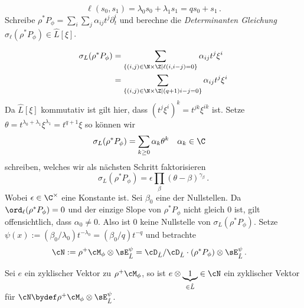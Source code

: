 \[
\ell(s_0,s_1)=\lambda_0s_0+\lambda_1s_1=qs_0+s_1 \,.
\]
Schreibe $\rho^*P_{\phi}=\sum_i\sum_j\alpha_{ij}t^j\partial_t^i$ und berechne
die \emph{Determinanten Gleichung} $\sigma_\ell(\rho^*P_{\phi})\in \hat L[\xi]$.
\begin{comment}
Schon gezeigt, das $ord_\ell = 0$?
\end{comment}
\begin{align*}
\sigma_L(\rho^*P_{\phi})
  &= \sum_{\{(i,j)\in\N\times\Z \mid \ell(i,i-j)=0\}}\alpha_{ij}t^j\xi^i\\
  &= \sum_{\{(i,j)\in\N\times\Z \mid (q+1)i-j=0\}}\alpha_{ij}t^j\xi^i
\end{align*}
Da $\hat L[\xi]$ kommutativ ist gilt hier, dass $(t^j\xi^i)^k=t^{jk}\xi^{ik}$ ist.
Setze $\theta=t^{\lambda_0+\lambda_1}\xi^{\lambda_1}=t^{q+1}\xi$ so können wir
\begin{align*}
\sigma_L(\rho^*P_{\phi}) &= \sum_{k\geq 0}\alpha_k\theta^k & & \alpha_k\in\C
\end{align*}
schreiben, welches wir als nächsten Schritt faktorisieren
\[
\sigma_L(\rho^*P_\phi)=\epsilon\prod_{\beta}(\theta-\beta)^{\gamma_\beta}\,.
\]
Wobei $\epsilon\in\C^\times$ eine Konstante ist.
Sei $\beta_0$  eine der Nullstellen.
Da $\ord_\ell(\rho^*P_\phi)=0$ und der einzige Slope von $\rho^*P_\phi$ nicht
gleich $0$ ist, gilt offensichtlich, dass $\alpha_0\neq0$. Also ist $0$ keine
Nullstelle von $\sigma_L(\rho^*P_\phi)$.
Setze $\psi(x):=(\beta_0/\lambda_0)t^{-\lambda_0}=(\beta_0/q)t^{-q}$ und
betrachte
\begin{align*}
\cN:=\rho^+\cM_\phi\otimes\sE_{\hat L}^\psi
  &= \cD_{\hat L}/\cD_{\hat L}\cdot(\rho^*P_{\phi})\otimes\sE_{\hat L}^\psi \,.
\end{align*}
\begin{lem}
Sei $e$ ein zyklischer Vektor zu $\rho^+\cM_\phi$, so ist $e\otimes
\underset{\in\hat L}{\underbrace{1}}\in\cN$ ein zyklischer Vektor für
$\cN\bydef\rho^+\cM_\phi\otimes\sE_{\hat L}^\psi$.
\end{lem}
